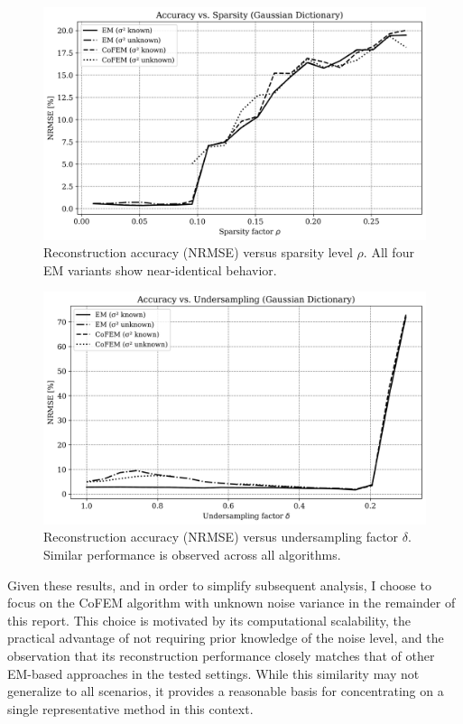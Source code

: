 \documentclass{article}
\begin{document}
\begin{figure}[H]
    \centering
    \includegraphics[width=0.75\linewidth]{Figures/accuracy_vs_sparsity_EMCoFEM.png}
    \caption{Reconstruction accuracy (NRMSE) versus sparsity level $ \rho $. All four EM variants show near-identical behavior.}
    \label{fig:accuracy_vs_sparsity}
\end{figure}

\begin{figure}[H]
    \centering
    \includegraphics[width=0.75\linewidth]{Figures/accuracy_vs_undersampling_EMCoFEM.png}
    \caption{Reconstruction accuracy (NRMSE) versus undersampling factor $ \delta $. Similar performance is observed across all algorithms.}
    \label{fig:accuracy_vs_undersampling}
\end{figure}


Given these results, and in order to simplify subsequent analysis, I choose to focus on the CoFEM algorithm with unknown noise variance in the remainder of this report. This choice is motivated by its computational scalability, the practical advantage of not requiring prior knowledge of the noise level, and the observation that its reconstruction performance closely matches that of other EM-based approaches in the tested settings. While this similarity may not generalize to all scenarios, it provides a reasonable basis for concentrating on a single representative method in this context.
\end{document}
